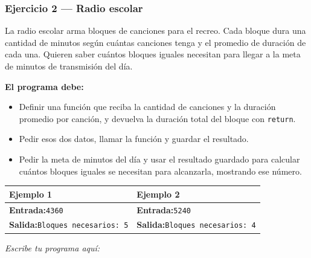 \documentclass[11pt]{article}
\begin{document}
\begin{cajaescribe}[height=5cm]
\end{cajaescribe}

\subsubsection*{Ejercicio 2 --- Radio escolar}
La radio escolar arma bloques de canciones para el recreo. Cada bloque dura una cantidad de minutos según cuántas canciones tenga y el promedio de duración de cada una. Quieren saber cuántos bloques iguales necesitan para llegar a la meta de minutos de transmisión del día.

\textbf{El programa debe:}
\begin{itemize}
  \item Definir una función que reciba la cantidad de canciones y la duración promedio por canción, y devuelva la duración total del bloque con \texttt{return}.
  \item Pedir esos dos datos, llamar la función y guardar el resultado.
  \item Pedir la meta de minutos del día y usar el resultado guardado para calcular cuántos bloques iguales se necesitan para alcanzarla, mostrando ese número.
\end{itemize}
\vspace{1mm}
\noindent\begin{tabularx}{\linewidth}{|X|X|}
\hline
\textbf{Ejemplo 1} & \textbf{Ejemplo 2} \\
\hline
\textbf{Entrada:}\newline \texttt{4}\newline \texttt{3}\newline \texttt{60} & \textbf{Entrada:}\newline \texttt{5}\newline \texttt{2}\newline \texttt{40} \\
\hline
\textbf{Salida:}\newline \texttt{Bloques necesarios: 5} & \textbf{Salida:}\newline \texttt{Bloques necesarios: 4} \\
\hline
\end{tabularx}
\vspace{1mm}
\vspace{2mm}\textit{Escribe tu programa aquí:}\vspace{1mm}

\begin{cajaescribe}[height=5cm]
\end{cajaescribe}
\end{document}
